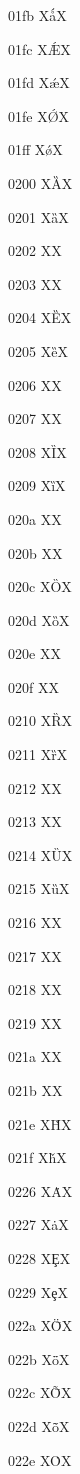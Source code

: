 \documentclass[11pt]{article}
\begin{document}
01fb X{\'{\aa}}X

01fc X{\'{\AE}}X

01fd X{\'{\ae}}X

01fe X{\'{\O}}X

01ff X{\'{\o}}X

0200 X{\G{A}}X

0201 X{\G{a}}X

0202 X{}X

0203 X{}X

0204 X{\G{E}}X

0205 X{\G{e}}X

0206 X{}X

0207 X{}X

0208 X{\G{I}}X

0209 X{\G{i}}X

020a X{}X

020b X{}X

020c X{\G{O}}X

020d X{\G{o}}X

020e X{}X

020f X{}X

0210 X{\G{R}}X

0211 X{\G{r}}X

0212 X{}X

0213 X{}X

0214 X{\G{U}}X

0215 X{\G{u}}X

0216 X{}X

0217 X{}X

0218 X{}X

0219 X{}X

021a X{}X

021b X{}X

021e X{\v{H}}X

021f X{\v{h}}X

0226 X{\.A}X

0227 X{\.a}X

0228 X{\c{E}}X

0229 X{\c{e}}X

022a X{\={\"{O}}}X

022b X{\={\"{o}}}X

022c X{\={\~{O}}}X

022d X{\={\~{o}}}X

022e X{\.O}X
\end{document}
